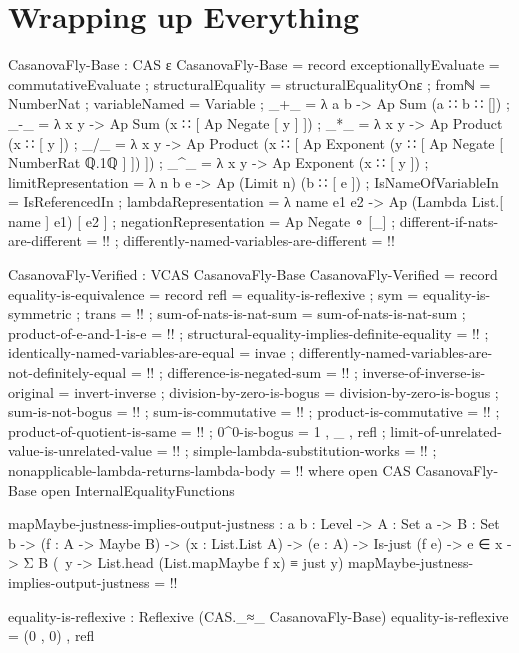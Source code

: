 \documentclass{report}
\begin{document}
\chapter{Wrapping up Everything}

\begin{code}
CasanovaFly-Base : CAS ε
CasanovaFly-Base = record
  { exceptionallyEvaluate = commutativeEvaluate
  ; structuralEquality = structuralEqualityOnε
  ; fromℕ = NumberNat
  ; variableNamed = Variable
  ; _+_ = λ a b -> Ap Sum (a ∷ b ∷ [])
  ; _-_ = λ x y -> Ap Sum (x ∷ [ Ap Negate [ y ] ])
  ; _*_ = λ x y -> Ap Product (x ∷ [ y ])
  ; _/_ = λ x y ->
     Ap Product (x ∷ [ Ap Exponent (y ∷ [ Ap Negate [ NumberRat ℚ.1ℚ ] ]) ])
  ; _^_ = λ x y -> Ap Exponent (x ∷ [ y ])
  ; limitRepresentation = λ n b e -> Ap (Limit n) (b ∷ [ e ])
  ; IsNameOfVariableIn = IsReferencedIn
  ; lambdaRepresentation = λ name e1 e2 -> Ap (Lambda List.[ name ] e1) [ e2 ]
  ; negationRepresentation = Ap Negate ∘ [_]
  ; different-if-nats-are-different = {!!}
  ; differently-named-variables-are-different = {!!}
  }

CasanovaFly-Verified : VCAS CasanovaFly-Base
CasanovaFly-Verified = record
  { equality-is-equivalence = record
    { refl = equality-is-reflexive
    ; sym = equality-is-symmetric
    ; trans = {!!}
    }
  ; sum-of-nats-is-nat-sum = sum-of-nats-is-nat-sum
  ; product-of-e-and-1-is-e = {!!}
  ; structural-equality-implies-definite-equality = {!!}
  ; identically-named-variables-are-equal = invae
  ; differently-named-variables-are-not-definitely-equal = {!!}
  ; difference-is-negated-sum = {!!}
  ; inverse-of-inverse-is-original = invert-inverse
  ; division-by-zero-is-bogus = division-by-zero-is-bogus
  ; sum-is-not-bogus = {!!}
  ; sum-is-commutative = {!!}
  ; product-is-commutative = {!!}
  ; product-of-quotient-is-same = {!!}
  ; 0^0-is-bogus = 1 , _ , refl
  ; limit-of-unrelated-value-is-unrelated-value = {!!}
  ; simple-lambda-substitution-works = {!!}
  ; nonapplicable-lambda-returns-lambda-body = {!!}
  }
  where
  open CAS CasanovaFly-Base
  open InternalEqualityFunctions

  mapMaybe-justness-implies-output-justness :
    {a b : Level} ->
    {A : Set a} ->
    {B : Set b} ->
    (f : A -> Maybe B) ->
    (x : List.List A) ->
    (e : A) ->
    Is-just (f e) ->
    e ∈ x ->
    Σ B (\ y -> List.head (List.mapMaybe f x) ≡ just y)
  mapMaybe-justness-implies-output-justness = {!!}

  equality-is-reflexive : Reflexive (CAS._≈_ CasanovaFly-Base)
  equality-is-reflexive = (0 , 0) , refl


\end{code}
\end{document}
